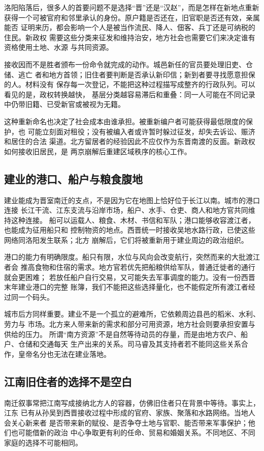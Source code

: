 洛阳陷落后，很多人的首要问题不是选择“晋”还是“汉赵”，而是怎样在新地点重新
获得一个可被官府和邻里承认的身份。原户籍是否还在，旧官职是否还有效，亲属能否
证明来历，都会影响一个人是被当作流民、降人、佃客、兵丁还是可纳税的住民。新政权
需要这些分类来征发和维持治安，地方社会也需要它们来决定谁有资格使用土地、水源
与共同资源。

接收因而不是胜者颁布一份命令就完成的动作。城邑新任的官员要处理旧吏、仓储、逃亡
者和地方首领；旧住者要判断是否承认新印信；新到者要寻找愿意担保的人。材料没有
保存每一次登记，不能把这种过程描写成整齐的行政队列。可以看见的是，政权转换越快，
基层分类越容易滞后和重叠：同一人可能在不同记录中仍带旧籍、已受新官或被视为无籍。

这种重新命名也决定了社会成本由谁承担。被重新编户者可能获得最低限度的保护，也
可能立刻面对租役；没有被编入者或许暂时躲过征发，却失去诉讼、赈济和居住的合法
渠道。北方留居者的经验因此不应仅作为东晋南渡的反面。新政权如何接收旧居民，是
两京崩解后重建区域秩序的核心工作。

\subsection{建业的港口、船户与粮食腹地}

建业能成为晋室南迁的支点，不是因为它在地图上恰好位于长江以南。城市的港口连接
长江干流、江东支流与沿岸市场，船户、水手、仓吏、商人和地方官共同维持这种连接。
船可以运载人、粮食、木材、书信和军队；港口能够收容渡江者，也能成为征用船只和
控制物资的地点。西晋统一时接收吴地水路行政，已使这些网络同洛阳发生联系；北方
崩解后，它们将被重新用于建业周边的政治组织。

港口的能力有明确限度。船只有限，水位与风向会改变航行，突然而来的大批渡江者会
推高食物和住宿的需求。地方官若优先把船粮供给军队，普通迁徙者的通行就会更困难；
若放任船户自行交易，又可能失去军事调度的能力。没有一份西晋末年建业港口的完整
账簿，我们不能把这些选择量化，也不能假定所有渡江者经过同一个码头。

城市后方同样重要。建业不是一个孤立的避难所，它依赖周边县邑的稻米、水利、劳力与
市场。北方来人带来新的需求和部分可用资源，地方社会则要承担安置与供给的压力。
所谓“南方资源”不是自然等待动员的存量，而是由地方农户、船户、仓储和交通每天
生产出来的关系。司马睿及其支持者若不能同这些关系合作，皇帝名分也无法在建业落地。

\subsection{江南旧住者的选择不是空白}

南迁叙事常把江南写成接纳北方人的容器，仿佛旧住者只在背景中等待。事实上，江东
已有从孙吴到西晋接收过程中形成的官府、家族、聚落和水路网络。当地人会关心新来者
是否带来新的赋役、是否争夺土地与官职、能否带来军事保护；他们也可能借新的政治
中心争取更有利的任命、贸易和婚姻关系。不同地区、不同家庭的选择不可能相同。

